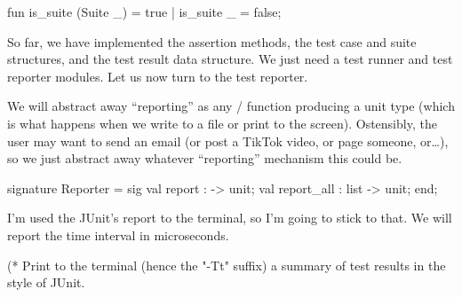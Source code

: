 fun is_suite (Suite _) = true
  | is_suite _ = false;
\eatline
{}\nwendcode{}\nwdocspar
\begin{node}
So far, we have implemented the assertion methods, the test case and
suite structures, and the test result data structure. We just need a
test runner and test reporter modules. Let us now turn to the test reporter.

We will abstract away ``reporting'' as any \SML/ function producing a
unit type (which is what happens when we write to a file or print to
the screen). Ostensibly, the user may want to send an email (or post a
TikTok video, or page someone, or\dots), so we just abstract away
whatever ``reporting'' mechanism this could be.
\end{node}

\nwenddocs{}\endmoddef\nwstartdeflinemarkup\nwenddeflinemarkup
signature Reporter = sig
  val report :  -> unit;
  val report_all :  list -> unit;
end;
\nwendcode{}\nwdocspar

\begin{node}
I'm used the JUnit's report to the terminal, so I'm going to stick to
that. We will report the time interval in microseconds.
\end{node}

\nwenddocs{}\endmoddef\nwstartdeflinemarkup\nwenddeflinemarkup
(* 
Print to the terminal (hence the "-Tt" suffix) a summary of test
results in the style of JUnit.

